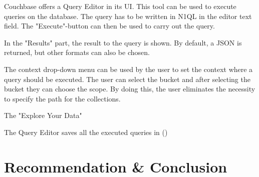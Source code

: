 Couchbase offers a Query Editor in its \ac{UI}. This tool can be used to execute queries on the database. The query has to be written in \ac{N1QL} in the editor text field. The "Execute"-button can then be used to carry out the query.

In the "Results" part, the result to the query is shown. By default, a JSON is returned, but other formats can also be chosen. 

The context drop-down menu can be used by the user to set the context where a query should be executed. The user can select the bucket and after selecting the bucket they can choose the scope. By doing this, the user eliminates the necessity to specify the path for the collections.

The "Explore Your Data" 

The Query Editor saves all the executed queries in (\cite{Couchbase.20230325})


\section{Recommendation \& Conclusion}